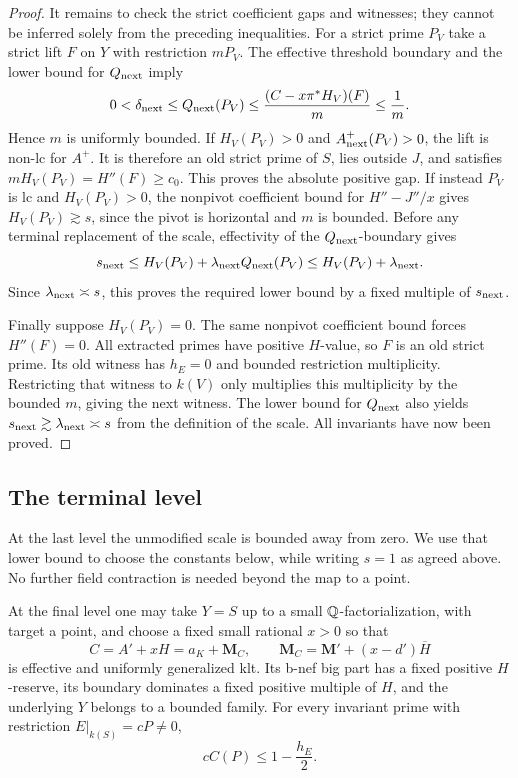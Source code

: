 \begin{proof}
It remains to check the strict coefficient gaps and witnesses; they
cannot be inferred solely from the preceding inequalities.  For a
strict prime $P_V$ take a strict lift $F$ on $Y$ with restriction
$mP_V$.  The effective threshold boundary and the lower bound for
$Q_{\rm next}$ imply
\[
      0<\delta_{\rm next}\le Q_{\rm next}(P_V)
          \le\frac{(C-x\pi^*H_V)(F)}m\le\frac1m.
\]
Hence $m$ is uniformly bounded.  If $H_V(P_V)>0$ and
$A^+_{\rm next}(P_V)>0$, the lift is non-lc for $A^+$.  It is therefore
an old strict prime of $S$, lies outside $J$, and satisfies
$mH_V(P_V)=H''(F)\ge c_0$.  This proves the absolute positive gap.
If instead $P_V$ is lc and $H_V(P_V)>0$, the nonpivot coefficient bound
for $H''-J''/x$ gives $H_V(P_V)\gtrsim s$, since the pivot is horizontal
and $m$ is bounded.  Before any terminal replacement of the scale,
effectivity of the $Q_{\rm next}$-boundary gives
\[
 s_{\rm next}\le H_V(P_V)+\lambda_{\rm next}Q_{\rm next}(P_V)
                  \le H_V(P_V)+\lambda_{\rm next}.
\]
Since $\lambda_{\rm next}\asymp s$, this proves the required lower
bound by a fixed multiple of $s_{\rm next}$.

Finally suppose $H_V(P_V)=0$.  The same nonpivot coefficient bound
forces $H''(F)=0$.  All extracted primes have positive $H$-value, so
$F$ is an old strict prime.  Its old witness has $h_E=0$ and bounded
restriction multiplicity.  Restricting that witness to $k(V)$ only
multiplies this multiplicity by the bounded $m$, giving the next
witness.  The lower bound for $Q_{\rm next}$ also yields
$s_{\rm next}\gtrsim\lambda_{\rm next}\asymp s$ from the definition of
the scale.  All invariants have now been proved.
\end{proof}

\subsection{The terminal level}

At the last level the unmodified scale is bounded away from zero. We use
that lower bound to choose the constants below, while writing $s=1$ as
agreed above. No further field contraction is needed beyond the map to a
point.

\begin{lemma}\label{b:scale-terminal}
At the final level one may take $Y=S$ up to a small
$\mathbb Q$-factorialization, with target a point, and choose a fixed small
rational $x>0$ so that
\[
 C=A'+xH=a_K+\mathbf M_C,
 \qquad \mathbf M_C=\mathbf M'+(x-d')\overline H
\]
is effective and uniformly generalized klt.  Its b-nef big part has
a fixed positive $H$-reserve, its boundary dominates a fixed positive
multiple of $H$, and the underlying $Y$ belongs to a bounded family.
For every invariant prime with restriction $E|_{k(S)}=cP\ne0$,
\begin{equation}\label{b:scale-terminal-bound}
                         cC(P)\le1-\frac{h_E}{2}.
\end{equation}
\end{lemma}

